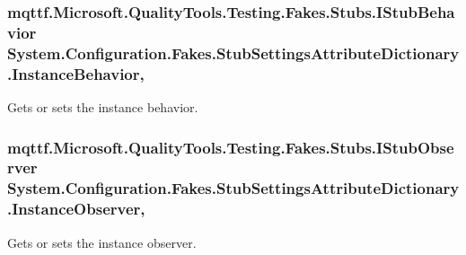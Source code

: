 \hypertarget{class_system_1_1_configuration_1_1_fakes_1_1_stub_settings_attribute_dictionary_ae4d6ea7ff3a928d65a204a8175758519}{
\subsubsection[{Instance\-Behavior}]{\setlength{\rightskip}{0pt plus 5cm}mqttf.\-Microsoft.\-Quality\-Tools.\-Testing.\-Fakes.\-Stubs.\-I\-Stub\-Behavior System.\-Configuration.\-Fakes.\-Stub\-Settings\-Attribute\-Dictionary.\-Instance\-Behavior\hspace{0.3cm}{\ttfamily [get]}, {\ttfamily [set]}}}\label{class_system_1_1_configuration_1_1_fakes_1_1_stub_settings_attribute_dictionary_ae4d6ea7ff3a928d65a204a8175758519}


Gets or sets the instance behavior.

\hypertarget{class_system_1_1_configuration_1_1_fakes_1_1_stub_settings_attribute_dictionary_ac3c93821267c47c272cc1dbf1b8da6d9}{
\subsubsection[{Instance\-Observer}]{\setlength{\rightskip}{0pt plus 5cm}mqttf.\-Microsoft.\-Quality\-Tools.\-Testing.\-Fakes.\-Stubs.\-I\-Stub\-Observer System.\-Configuration.\-Fakes.\-Stub\-Settings\-Attribute\-Dictionary.\-Instance\-Observer\hspace{0.3cm}{\ttfamily [get]}, {\ttfamily [set]}}}\label{class_system_1_1_configuration_1_1_fakes_1_1_stub_settings_attribute_dictionary_ac3c93821267c47c272cc1dbf1b8da6d9}


Gets or sets the instance observer.

